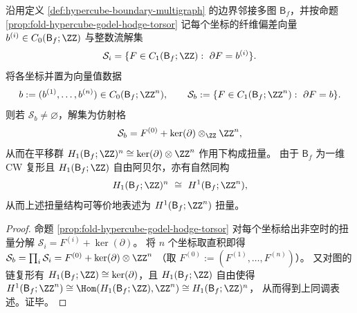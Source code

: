 
\begin{corollary}\label{cor:fold-boundary-stokes-torsor-h1-h1}
沿用定义 \ref{def:hypercube-boundary-multigraph} 的边界邻接多图 \(\mathsf B_f\)，并按命题 \ref{prop:fold-hypercube-godel-hodge-torsor} 记每个坐标的纤维偏差向量 \(b^{(i)}\in C_0(\mathsf B_f;\ZZ)\) 与整数流解集
\[
\mathcal S_i=\{F\in C_1(\mathsf B_f;\ZZ):\ \partial F=b^{(i)}\}.
\]
将各坐标并置为向量值数据
\[
b:=(b^{(1)},\dots,b^{(n)})\in C_0(\mathsf B_f;\ZZ^n),
\qquad
\mathcal S_b:=\{F\in C_1(\mathsf B_f;\ZZ^n):\ \partial F=b\}.
\]
则若 \(\mathcal S_b\neq\varnothing\)，解集为仿射格
\[
\mathcal S_b=F^{(0)}+\ker(\partial)\otimes_{\ZZ}\ZZ^n,
\]
从而在平移群 \(H_1(\mathsf B_f;\ZZ)^n\cong \ker(\partial)\otimes\ZZ^n\) 作用下构成扭量。
由于 \(\mathsf B_f\) 为一维 CW 复形且 \(H_1(\mathsf B_f;\ZZ)\) 自由阿贝尔，亦有自然同构
\[
H_1(\mathsf B_f;\ZZ)^n
\ \cong\
H^1(\mathsf B_f;\ZZ^n),
\]
从而上述扭量结构可等价地表述为 \(H^1(\mathsf B_f;\ZZ^n)\) 扭量。
\end{corollary}
\begin{proof}
命题 \ref{prop:fold-hypercube-godel-hodge-torsor} 对每个坐标给出非空时的扭量分解 \(\mathcal S_i=F^{(i)}+\ker(\partial)\)。
将 \(n\) 个坐标取直积即得
\(
\mathcal S_b=\prod_i \mathcal S_i = F^{(0)}+\ker(\partial)\otimes\ZZ^n
\)
（取 \(F^{(0)}:=(F^{(1)},\dots,F^{(n)})\)）。
又对图的链复形有 \(H_1(\mathsf B_f;\ZZ)\cong \ker(\partial)\)，且 \(H_1(\mathsf B_f;\ZZ)\) 自由使得
\(
H^1(\mathsf B_f;\ZZ^n)\cong \Hom(H_1(\mathsf B_f;\ZZ),\ZZ^n)\cong H_1(\mathsf B_f;\ZZ)^n
\)，
从而得到上同调表述。证毕。
\end{proof}

\endinput
